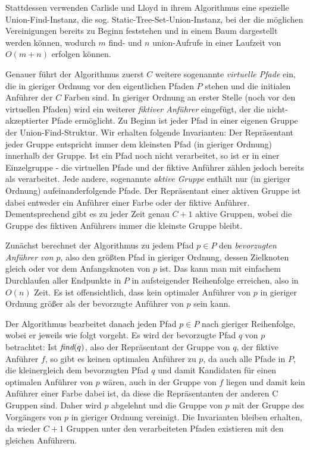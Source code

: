 Stattdessen verwenden Carlisle und Lloyd in ihrem Algorithmus eine spezielle Union-Find-Instanz, die sog.
Static-Tree-Set-Union-Instanz, bei der die möglichen Vereinigungen bereits zu Beginn feststehen und in einem Baum
dargestellt werden können, wodurch  $m$ find- und $n$ union-Aufrufe in einer Laufzeit von $O(m + n)$ erfolgen können.

Genauer führt der Algorithmus zuerst $C$ weitere sogenannte {\em virtuelle Pfade} ein, die in gieriger Ordnung
vor den eigentlichen Pfaden $P$ stehen und die initialen Anführer der $C$ Farben sind.
In gieriger Ordnung an erster Stelle (noch vor den virtuellen Pfaden) wird ein weiterer {\em fiktiver Anführer}
eingefügt, der die  nicht-akzeptierter Pfade ermöglicht.
Zu Beginn ist jeder Pfad in einer eigenen Gruppe der Union-Find-Struktur.
Wir erhalten folgende Invarianten:
Der Repräsentant jeder Gruppe entspricht immer dem kleinsten Pfad (in gieriger Ordnung) innerhalb der Gruppe.
Ist ein Pfad noch nicht verarbeitet, so ist er in einer Einzelgruppe - die virtuellen Pfade und der fiktive Anführer
zählen jedoch bereits als verarbeitet.
Jede andere, sogenannte {\em aktive Gruppe} enthält nur (in gieriger Ordnung) aufeinanderfolgende Pfade.
Der Repräsentant einer aktiven Gruppe ist dabei entweder ein Anführer einer Farbe oder der fiktive Anführer.
Dementsprechend gibt es zu jeder Zeit genau $C+1$ aktive Gruppen, wobei die Gruppe des fiktiven
Anführers immer die kleinste Gruppe bleibt.

Zunächst berechnet der Algorithmus zu jedem Pfad $p \in P$ den {\em bevorzugten Anführer von $p$}, also den größten Pfad
in gieriger Ordnung, dessen Zielknoten gleich oder vor dem Anfangsknoten von $p$ ist.
Das kann man mit einfachem Durchlaufen aller Endpunkte in $P$ in aufsteigender Reihenfolge erreichen, also in $O(n)$
Zeit.
Es ist offensichtlich, dass kein optimaler Anführer von $p$ in gieriger Ordnung größer als der bevorzugte Anführer von
$p$ sein kann.

Der Algorithmus bearbeitet danach jeden Pfad $p \in P$ nach gieriger Reihenfolge, wobei er jeweils wie folgt vorgeht.
Es wird der bevorzugte Pfad $q$ von $p$ betrachtet:
Ist $\text{\em find}(q)$, also der Repräsentant der Gruppe von $q$, der fiktive Anführer $f$, so gibt es keinen optimalen Anführer
zu $p$, da auch alle Pfade in $P$, die kleinergleich dem bevorzugten Pfad $q$ und damit Kandidaten für einen optimalen
Anführer von $p$ wären, auch in der Gruppe von $f$ liegen und damit kein Anführer einer Farbe dabei ist, da diese die
Repräsentanten der anderen C Gruppen sind.
Daher wird $p$ abgelehnt und die Gruppe von $p$ mit der Gruppe des Vorgängers von $p$ in gieriger Ordnung vereinigt.
Die Invarianten bleiben erhalten, da wieder $C+1$ Gruppen unter den verarbeiteten Pfaden existieren mit den gleichen
Anführern.

